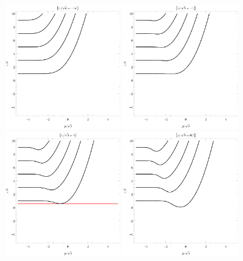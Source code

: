 \begin{figure}[p]
    \centering
    \noindent
    \includegraphics[width=0.45\textwidth]{grafy/dirichlet.pdf}%
    \hspace{0.1\textwidth}%
    \includegraphics[width=0.45\textwidth]{grafy/robin-1.pdf}%
    \\[1em]%
    \includegraphics[width=0.45\textwidth]{grafy/robin0-degennes.pdf}%
    \hspace{0.1\textwidth}%
    \includegraphics[width=0.45\textwidth]{grafy/robin0.5.pdf}%

\end{figure}
